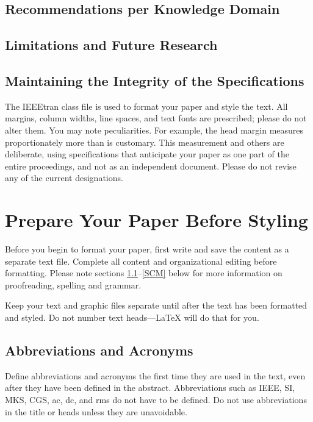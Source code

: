 \documentclass[conference]{IEEEtran}
\begin{document}
\subsection{Recommendations per Knowledge Domain}
\subsection{Limitations and Future Research}

\printbibliography

\subsection{Maintaining the Integrity of the Specifications}

The IEEEtran class file is used to format your paper and style the text. All margins, 
column widths, line spaces, and text fonts are prescribed; please do not 
alter them. You may note peculiarities. For example, the head margin
measures proportionately more than is customary. This measurement 
and others are deliberate, using specifications that anticipate your paper 
as one part of the entire proceedings, and not as an independent document. 
Please do not revise any of the current designations.

\section{Prepare Your Paper Before Styling}
Before you begin to format your paper, first write and save the content as a 
separate text file. Complete all content and organizational editing before 
formatting. Please note sections \ref{AA}--\ref{SCM} below for more information on 
proofreading, spelling and grammar.

Keep your text and graphic files separate until after the text has been 
formatted and styled. Do not number text heads---{\LaTeX} will do that 
for you.

\subsection{Abbreviations and Acronyms}\label{AA}
Define abbreviations and acronyms the first time they are used in the text, 
even after they have been defined in the abstract. Abbreviations such as 
IEEE, SI, MKS, CGS, ac, dc, and rms do not have to be defined. Do not use 
abbreviations in the title or heads unless they are unavoidable.
\end{document}
